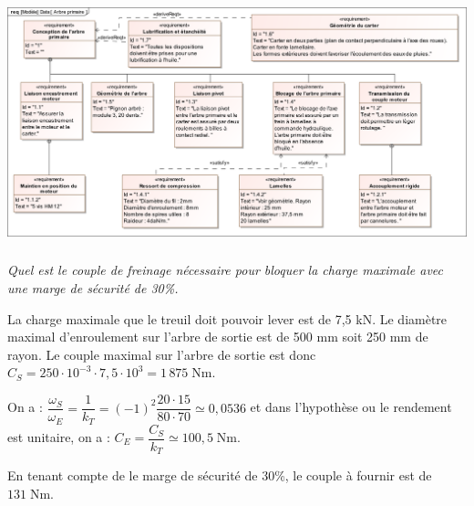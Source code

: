 \documentclass[10pt,fleqn]{article} %
\begin{document}
\begin{center}
\includegraphics[width=\textwidth]{images/SysML/ArbrePrimaire.png}
\end{center}
%
\fi
\subparagraph{}
\textit{Quel est le couple de freinage nécessaire pour bloquer la charge maximale avec une marge de sécurité de 30\%.}

\ifprof
\begin{corrige}
La charge maximale que le treuil doit pouvoir lever est de 7,5 kN. Le diamètre maximal d'enroulement sur l'arbre de sortie est de 500 mm soit 250 mm de rayon. Le couple maximal sur l'arbre de sortie est donc $C_S = 250\cdot 10^{-3}\cdot 7,5\cdot 10^{3} = 1\, 875 \; \text{Nm}.$

On a : $\dfrac{\omega_S}{\omega_E} =\dfrac{1}{k_T}= (-1)^2 \dfrac{20\cdot 15}{80\cdot 70}\simeq 0,0536$ et dans l'hypothèse ou le rendement est unitaire, on a : $C_E = \dfrac{C_S}{k_T} \simeq 100,5\; \text{Nm}$. 

En tenant compte de le marge de sécurité de 30\%, le couple à fournir est de $131\; \text{Nm}$.

\end{corrige}
\else
\fi
\end{document}
